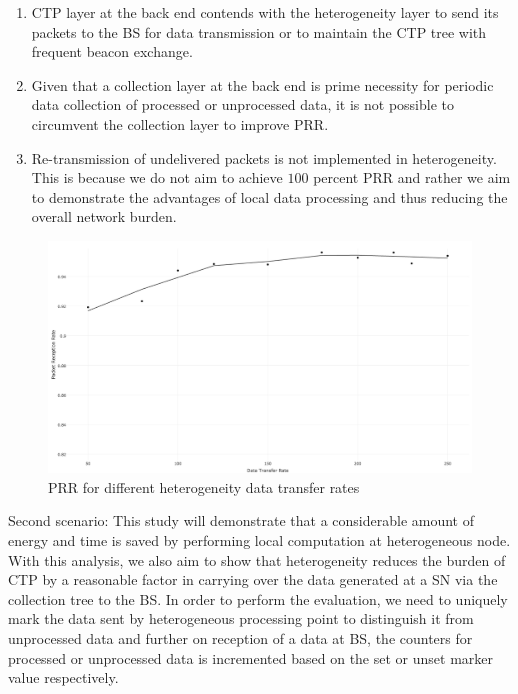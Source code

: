         \begin{enumerate}
            \item \ac{CTP} layer at the back end contends with the heterogeneity layer to send its packets to the \ac{BS} for data transmission or to maintain the \ac{CTP} tree with frequent beacon exchange. 
            
            \item Given that a collection layer at the back end is prime necessity for periodic data collection of processed or unprocessed data, it is not possible to circumvent the collection layer to improve \ac{PRR}.
            
            \item Re-transmission of undelivered packets is not implemented in heterogeneity. This is because we do not aim to achieve $100$ percent \ac{PRR} and rather we aim to demonstrate the advantages of local data processing and thus reducing the overall network burden.
        \end{enumerate}
        
	\begin{figure}
    \centering
    \includegraphics[width=1.0\textwidth]{gfx/RPlots/PrrVsDataTransferRate.png}
    \caption{PRR for different heterogeneity data transfer rates}
    \label{fig:PRRHeterogeneity}
    \end{figure}
    
    \par
    Second scenario: This study will demonstrate that a considerable amount of energy and time is saved by performing local computation at heterogeneous node. With this analysis, we also aim to show that heterogeneity reduces the burden of \ac{CTP} by a reasonable factor in carrying over the data generated at a \ac{SN} via the collection tree to the \ac{BS}. In order to perform the evaluation, we need to uniquely mark the data sent by heterogeneous processing point to distinguish it from unprocessed data and further on reception of a data at \ac{BS}, the counters for processed or unprocessed data is incremented based on the set or unset marker value respectively. 
    
